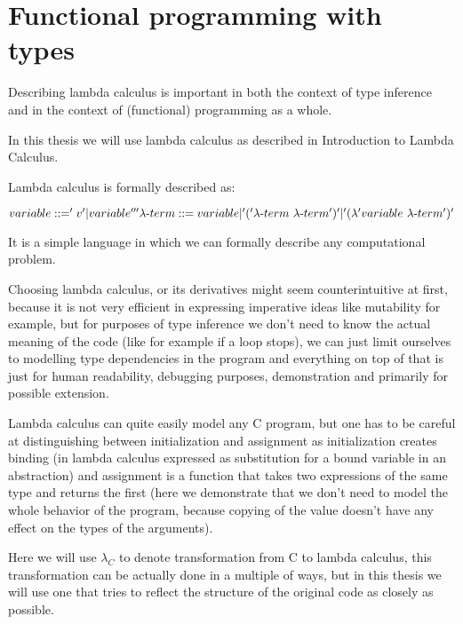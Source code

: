 \chapter{Functional programming with types}

Describing lambda calculus is important in both the context of type inference and in the context of (functional)
programming as a whole.

In this thesis we will use lambda calculus as described in Introduction to Lambda Calculus.  %

Lambda calculus is formally described as:

$variable ::= 'v' | variable ''' \\ \lambda\mbox{-}term ::= variable | '(' \lambda\mbox{-}term\ \lambda\mbox{-}term ')' |  '(\lambda' variable\ \lambda\mbox{-}term ')'$



It is a simple language in which we can formally describe any computational problem.

Choosing lambda calculus, or its derivatives might seem counterintuitive at first, because it
is not very efficient in expressing imperative ideas like mutability for example, but for
purposes of type inference we don't need to know the actual meaning of the code (like for example
if a loop stops), we can just limit ourselves to modelling type dependencies in the program and
everything on top of that is just for human readability, debugging purposes, demonstration and
primarily for possible extension.

Lambda calculus can quite easily model any C program, but one has to be careful at distinguishing
between initialization and assignment as initialization creates binding (in lambda calculus expressed
as substitution for a bound variable in an abstraction) and assignment is a function that takes two
expressions of the same type and returns the first (here we demonstrate that we don't need to
model the whole behavior of the program, because copying of the value doesn't have any effect on
the types of the arguments).

Here we will use $\lambda_C$ to denote transformation from C to lambda calculus,
this transformation can be actually done in a multiple of ways, but in this thesis we will use one that tries to
reflect the structure of the original code as closely as possible.

